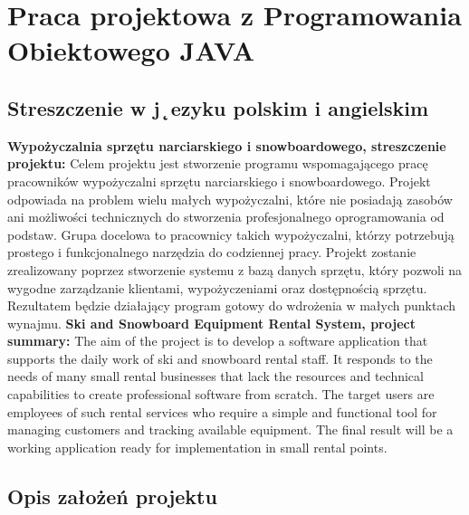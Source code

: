 \chapter{Praca projektowa z Programowania Obiektowego JAVA}
\label{cha:elementyPracyproj}


\section{Streszczenie w j˛ezyku polskim i angielskim}
    \noindent \textbf{Wypożyczalnia sprzętu narciarskiego i snowboardowego, streszczenie projektu:}
    \newline \indent
    Celem projektu jest stworzenie programu wspomagającego pracę pracowników wypożyczalni sprzętu narciarskiego i snowboardowego. Projekt odpowiada na problem wielu małych wypożyczalni, które nie posiadają zasobów ani możliwości technicznych do stworzenia profesjonalnego oprogramowania od podstaw. Grupa docelowa to pracownicy takich wypożyczalni, którzy potrzebują prostego i funkcjonalnego narzędzia do codziennej pracy. Projekt zostanie zrealizowany poprzez stworzenie systemu z bazą danych sprzętu, który pozwoli na wygodne zarządzanie klientami, wypożyczeniami oraz dostępnością sprzętu. Rezultatem będzie działający program gotowy do wdrożenia w małych punktach wynajmu.
    \vspace{10pt} \newline 
    \noindent \textbf{Ski and Snowboard Equipment Rental System, project summary:}
    \newline \indent
    The aim of the project is to develop a software application that supports the daily work of ski and snowboard rental staff. It responds to the needs of many small rental businesses that lack the resources and technical capabilities to create professional software from scratch. The target users are employees of such rental services who require a simple and functional tool for managing customers and tracking available equipment. The final result will be a working application ready for implementation in small rental points.


\section{Opis założeń projektu}

